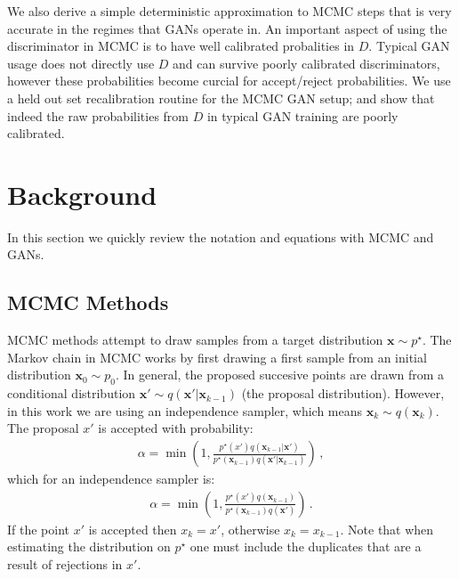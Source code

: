 \documentclass{article}
\renewcommand{\vec}[1]{{\boldsymbol{\mathbf{#1}}}} %
\newcommand{\sample}{\sim}
\newcommand{\given}{|}
\newcommand{\target}{{p^\star}}
\newcommand{\prop}{q}
\newcommand{\pinit}{{p_0}}
\begin{document}
We also derive a simple deterministic approximation to MCMC steps that is very accurate in the regimes that GANs operate in.
An important aspect of using the discriminator in MCMC is to have well calibrated probalities in $D$.
Typical GAN usage does not directly use $D$ and can survive poorly calibrated discriminators, however these probabilities become curcial for accept/reject probabilities.
We use a held out set recalibration routine for the MCMC GAN setup; and show that indeed the raw probabilities from $D$ in typical GAN training are poorly calibrated.

\section{Background}

In this section we quickly review the notation and equations with MCMC and GANs.

\subsection{MCMC Methods}

MCMC methods attempt to draw samples from a target distribution $\vec x \sample \target$.
The Markov chain in MCMC works by first drawing a first sample from an initial distribution $\vec x_0 \sample \pinit$.
In general, the proposed succesive points are drawn from a conditional distribution $\vec x' \sample \prop(\vec x' \given \vec x_{k-1})$ (the proposal distribution)\@.
However, in this work we are using an independence sampler, which means $\vec x_k \sample \prop(\vec x_k)$.
The proposal $x'$ is accepted with probability:
\begin{align}
  \alpha = \min(1, \frac{\target(x')\prop(\vec x_{k-1} \given \vec x')}{\target(\vec x_{k-1})\prop(\vec x' \given \vec x_{k-1})})\,,
\end{align}
which for an independence sampler is:
\begin{align}
  \alpha = \min(1, \frac{\target(x')\prop(\vec x_{k-1})}{\target(\vec x_{k-1})\prop(\vec x')})\,.
\end{align}
If the point $x'$ is accepted then $x_k = x'$, otherwise $x_k = x_{k-1}$.
Note that when estimating the distribution on $\target$ one must include the duplicates that are a result of rejections in $x'$.
\end{document}
